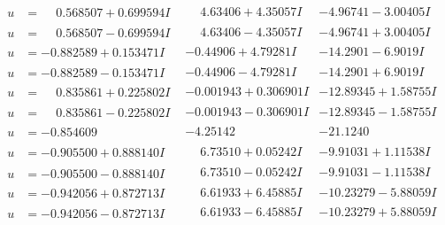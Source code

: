 \documentclass[1p]{elsarticle_modified}
\theoremstyle{definition}
\begin{document}
$$\begin{array}{c|c|c}
\begin{aligned}
u &= \phantom{-}0.568507 + 0.699594 I\end{aligned}
 & \phantom{-}4.63406 + 4.35057 I & -4.96741 - 3.00405 I \\ \hline\begin{aligned}
u &= \phantom{-}0.568507 - 0.699594 I\end{aligned}
 & \phantom{-}4.63406 - 4.35057 I & -4.96741 + 3.00405 I \\ \hline\begin{aligned}
u &= -0.882589 + 0.153471 I\end{aligned}
 & -0.44906 + 4.79281 I & -14.2901 - 6.9019 I \\ \hline\begin{aligned}
u &= -0.882589 - 0.153471 I\end{aligned}
 & -0.44906 - 4.79281 I & -14.2901 + 6.9019 I \\ \hline\begin{aligned}
u &= \phantom{-}0.835861 + 0.225802 I\end{aligned}
 & -0.001943 + 0.306901 I & -12.89345 + 1.58755 I \\ \hline\begin{aligned}
u &= \phantom{-}0.835861 - 0.225802 I\end{aligned}
 & -0.001943 - 0.306901 I & -12.89345 - 1.58755 I \\ \hline\begin{aligned}
u &= -0.854609\phantom{ +0.000000I}\end{aligned}
 & -4.25142\phantom{ +0.000000I} & -21.1240\phantom{ +0.000000I} \\ \hline\begin{aligned}
u &= -0.905500 + 0.888140 I\end{aligned}
 & \phantom{-}6.73510 + 0.05242 I & -9.91031 + 1.11538 I \\ \hline\begin{aligned}
u &= -0.905500 - 0.888140 I\end{aligned}
 & \phantom{-}6.73510 - 0.05242 I & -9.91031 - 1.11538 I \\ \hline\begin{aligned}
u &= -0.942056 + 0.872713 I\end{aligned}
 & \phantom{-}6.61933 + 6.45885 I & -10.23279 - 5.88059 I \\ \hline\begin{aligned}
u &= -0.942056 - 0.872713 I\end{aligned}
 & \phantom{-}6.61933 - 6.45885 I & -10.23279 + 5.88059 I \\ \hline\begin{aligned}

\end{aligned}
\end{array}$$
\end{document}
